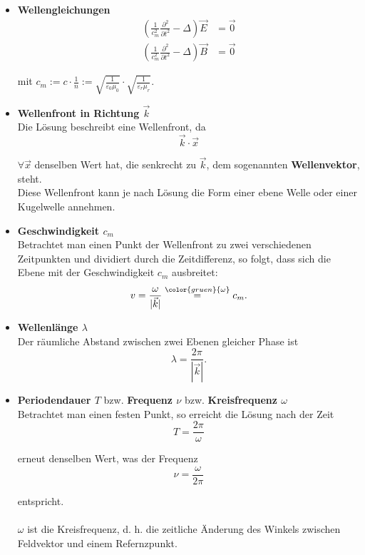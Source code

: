 \documentclass{article}
\newcommand{\lr}[1]{\left(#1\right)}
\newcommand{\comment}[1]{{\color{gruen} {#1}}}
\begin{document}
	\begin{itemize}
		\item \textbf{Wellengleichungen}
			\begin{align}
				\lr{ \frac{1}{c_m^2}\frac{\partial^2}{\partial t^2} - \Delta } \vec{E} &= \vec{0} \\
				\lr{ \frac{1}{c_m^2}\frac{\partial^2}{\partial t^2} - \Delta } \vec{B} &= \vec{0}
			\end{align}
		
		mit $c_m := c \cdot \frac{1}{n} := \sqrt{ \frac{1}{\varepsilon_0 \mu_0} } \cdot \sqrt{ \frac{1}{ \varepsilon_r \mu_r } }$.
		
		
		\item \textbf{Wellenfront in Richtung $\vec{k}$}\\
		Die Lösung beschreibt eine Wellenfront, da
			\begin{equation}
				\vec{k}\cdot \vec{x}
			\end{equation}
		
		$\forall \vec{x}$ denselben Wert hat, die senkrecht zu $\vec{k}$, dem sogenannten \textbf{Wellenvektor}, steht.\\
		Diese Wellenfront kann je nach Lösung die Form einer ebene Welle oder einer Kugelwelle annehmen.


		\item \textbf{Geschwindigkeit $c_m$}\\
		Betrachtet man einen Punkt der Wellenfront zu zwei verschiedenen Zeitpunkten und dividiert durch die Zeitdifferenz, so folgt, dass sich die Ebene mit der Geschwindigkeit $c_m$ ausbreitet:
			\begin{equation}
				v = \frac{\omega}{|\vec{k}|} \stackrel{\comment{\omega}}{=} c_m.
			\end{equation}


		\item \textbf{Wellenlänge $\lambda$}\\
		Der räumliche Abstand zwischen zwei Ebenen gleicher Phase ist
			\begin{equation}
				\lambda = \frac{2\pi}{|\vec{k}|}.
			\end{equation}


		\item \textbf{Periodendauer $T$} bzw. \textbf{Frequenz $\nu$} bzw. \textbf{Kreisfrequenz $\omega$}\\
		Betrachtet man einen festen Punkt, so erreicht die Lösung nach der Zeit
			\begin{equation}
				T = \frac{2\pi}{\omega}
			\end{equation}

		erneut denselben Wert, was der Frequenz
			\begin{equation}
				\nu = \frac{\omega}{2\pi}
			\end{equation}
		
		entspricht.\\
		\\
		$\omega$ ist die Kreisfrequenz, d. h. die zeitliche Änderung des Winkels zwischen Feldvektor und einem Refernzpunkt.
	\end{itemize}
\end{document}

